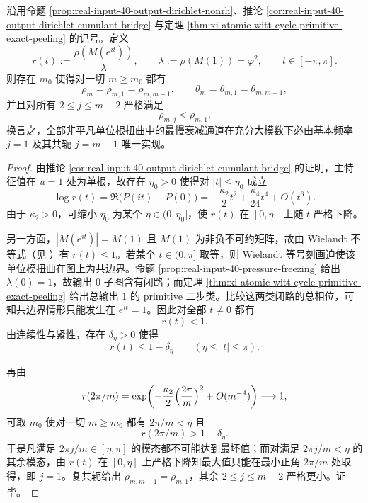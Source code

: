 \begin{theorem}[非平凡单位根扭曲的最坏模态最终坍缩到基本频率]\label{thm:xi-output-potential-dirichlet-global-worst-mode-j1}
沿用命题 \ref{prop:real-input-40-output-dirichlet-nonrh}、推论 \ref{cor:real-input-40-output-dirichlet-cumulant-bridge} 与定理 \ref{thm:xi-atomic-witt-cycle-primitive-exact-peeling} 的记号。定义
\[
r(t):=\frac{\rho(M(e^{it}))}{\lambda},
\qquad
\lambda:=\rho(M(1))=\varphi^2,
\qquad
t\in[-\pi,\pi].
\]
则存在 \(m_0\) 使得对一切 \(m\ge m_0\) 都有
\[
\rho_m=\rho_{m,1}=\rho_{m,m-1},
\qquad
\theta_m=\theta_{m,1}=\theta_{m,m-1},
\]
并且对所有 \(2\le j\le m-2\) 严格满足
\[
\rho_{m,j}<\rho_{m,1}.
\]
换言之，全部非平凡单位根扭曲中的最慢衰减通道在充分大模数下必由基本频率 \(j=1\) 及其共轭 \(j=m-1\) 唯一实现。
\end{theorem}
\begin{proof}
由推论 \ref{cor:real-input-40-output-dirichlet-cumulant-bridge} 的证明，主特征值在 \(u=1\) 处为单根，故存在 \(\eta_0>0\) 使得对 \(|t|\le \eta_0\) 成立
\[
\log r(t)=\Re\bigl(P(it)-P(0)\bigr)
=-\frac{\kappa_2}{2}t^2+\frac{\kappa_4}{24}t^4+O(t^6).
\]
由于 \(\kappa_2>0\)，可缩小 \(\eta_0\) 为某个 \(\eta\in(0,\eta_0]\)，使 \(r(t)\) 在 \([0,\eta]\) 上随 \(t\) 严格下降。

另一方面，\(|M(e^{it})|=M(1)\) 且 \(M(1)\) 为非负不可约矩阵，故由 Wielandt 不等式（见 \cite{Wielandt1950UnzerlegbareNichtnegative}）有 \(r(t)\le 1\)。若某个 \(t\in(0,\pi]\) 取等，则 Wielandt 等号刻画迫使该单位模扭曲在图上为共边界。命题 \ref{prop:real-input-40-pressure-freezing} 给出 \(\lambda(0)=1\)，故输出 \(0\) 子图含有闭路；而定理 \ref{thm:xi-atomic-witt-cycle-primitive-exact-peeling} 给出总输出 \(1\) 的 primitive 二步类。比较这两类闭路的总相位，可知共边界情形只能发生在 \(e^{it}=1\)。因此对全部 \(t\neq 0\) 都有
\[
r(t)<1.
\]
由连续性与紧性，存在 \(\delta_\eta>0\) 使得
\[
r(t)\le 1-\delta_\eta
\qquad (\eta\le |t|\le \pi).
\]

再由
\[
r(2\pi/m)
=\exp\!\left(
-\frac{\kappa_2}{2}\Bigl(\frac{2\pi}{m}\Bigr)^2
+O(m^{-4})
\right)
\longrightarrow 1,
\]
可取 \(m_0\) 使对一切 \(m\ge m_0\) 都有 \(2\pi/m<\eta\) 且
\[
r(2\pi/m)>1-\delta_\eta.
\]
于是凡满足 \(2\pi j/m\in[\eta,\pi]\) 的模态都不可能达到最坏值；而对满足 \(2\pi j/m<\eta\) 的其余模态，由 \(r(t)\) 在 \([0,\eta]\) 上严格下降知最大值只能在最小正角 \(2\pi/m\) 处取得，即 \(j=1\)。复共轭给出 \(\rho_{m,m-1}=\rho_{m,1}\)，其余 \(2\le j\le m-2\) 严格更小。证毕。
\end{proof}


